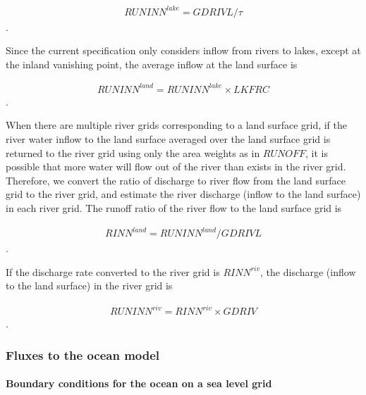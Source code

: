 \begin{eqnarray} RUNINN^{lake}=GDRIVL/\tau \end{eqnarray}.

Since the current specification only considers inflow from rivers to
lakes, except at the inland vanishing point, the average inflow at the
land surface is

\begin{eqnarray} RUNINN^{land}=RUNINN^{lake} \times LKFRC \end{eqnarray}.

When there are multiple river grids corresponding to a land surface
grid, if the river water inflow to the land surface averaged over the
land surface grid is returned to the river grid using only the area
weights as in \(RUNOFF\), it is possible that more water will flow out
of the river than exists in the river grid. Therefore, we convert the
ratio of discharge to river flow from the land surface grid to the river
grid, and estimate the river discharge (inflow to the land surface) in
each river grid. The runoff ratio of the river flow to the land surface
grid is

\begin{eqnarray} RINN^{land}=RUNINN^{land}/GDRIVL \end{eqnarray}.

If the discharge rate converted to the river grid is \(RINN^{riv}\), the
discharge (inflow to the land surface) in the river grid is

\begin{eqnarray} RUNINN^{riv}=RINN^{riv} \times GDRIV \end{eqnarray}.

\hypertarget{fluxes-to-the-ocean-model}{%
\subsubsection{Fluxes to the ocean
model}\label{fluxes-to-the-ocean-model}}

\hypertarget{boundary-conditions-for-the-ocean-on-a-sea-level-grid}{%
\paragraph{Boundary conditions for the ocean on a sea level
grid}\label{boundary-conditions-for-the-ocean-on-a-sea-level-grid}}

